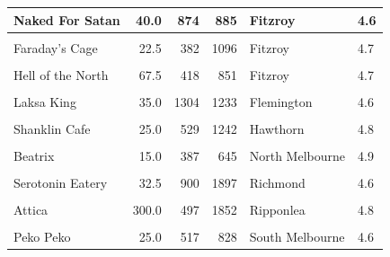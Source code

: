 \documentclass[11pt,a4paper,]{article}
\begin{document}
\begin{table}[!h]
\begin{tabular}[t]{l|r|r|r|l|l}
\hline
Naked For Satan & 40.0 & 874 & 885 & Fitzroy & 4.6\\
\hline
\cellcolor{gray!6}{Lune Croissanterie} & \cellcolor{gray!6}{12.5} & \cellcolor{gray!6}{754} & \cellcolor{gray!6}{1831} & \cellcolor{gray!6}{Fitzroy} & \cellcolor{gray!6}{4.9}\\
\hline
Faraday's Cage & 22.5 & 382 & 1096 & Fitzroy & 4.7\\
\hline
\cellcolor{gray!6}{Cutler \& Co} & \cellcolor{gray!6}{100.0} & \cellcolor{gray!6}{570} & \cellcolor{gray!6}{988} & \cellcolor{gray!6}{Fitzroy} & \cellcolor{gray!6}{4.7}\\
\hline
Hell of the North & 67.5 & 418 & 851 & Fitzroy & 4.7\\
\hline
\cellcolor{gray!6}{Hinoki Japanese Pantry} & \cellcolor{gray!6}{27.5} & \cellcolor{gray!6}{274} & \cellcolor{gray!6}{383} & \cellcolor{gray!6}{Fitzroy} & \cellcolor{gray!6}{4.9}\\
\hline
Laksa King & 35.0 & 1304 & 1233 & Flemington & 4.6\\
\hline
\cellcolor{gray!6}{Shira Nui} & \cellcolor{gray!6}{75.0} & \cellcolor{gray!6}{424} & \cellcolor{gray!6}{754} & \cellcolor{gray!6}{Glen Waverley} & \cellcolor{gray!6}{4.8}\\
\hline
Shanklin Cafe & 25.0 & 529 & 1242 & Hawthorn & 4.8\\
\hline
\cellcolor{gray!6}{The Proud Peacock} & \cellcolor{gray!6}{22.5} & \cellcolor{gray!6}{630} & \cellcolor{gray!6}{481} & \cellcolor{gray!6}{Mount Waverley} & \cellcolor{gray!6}{4.8}\\
\hline
Beatrix & 15.0 & 387 & 645 & North Melbourne & 4.9\\
\hline
\cellcolor{gray!6}{Dexter} & \cellcolor{gray!6}{55.0} & \cellcolor{gray!6}{685} & \cellcolor{gray!6}{1498} & \cellcolor{gray!6}{Preston} & \cellcolor{gray!6}{4.9}\\
\hline
Serotonin Eatery & 32.5 & 900 & 1897 & Richmond & 4.6\\
\hline
\cellcolor{gray!6}{Minamishima} & \cellcolor{gray!6}{225.0} & \cellcolor{gray!6}{297} & \cellcolor{gray!6}{1435} & \cellcolor{gray!6}{Richmond} & \cellcolor{gray!6}{4.9}\\
\hline
Attica & 300.0 & 497 & 1852 & Ripponlea & 4.8\\
\hline
\cellcolor{gray!6}{Komeyui} & \cellcolor{gray!6}{75.0} & \cellcolor{gray!6}{249} & \cellcolor{gray!6}{1316} & \cellcolor{gray!6}{South Melbourne} & \cellcolor{gray!6}{4.7}\\
\hline
Peko Peko & 25.0 & 517 & 828 & South Melbourne & 4.6\\

\end{tabular}
\end{table}
\end{document}

